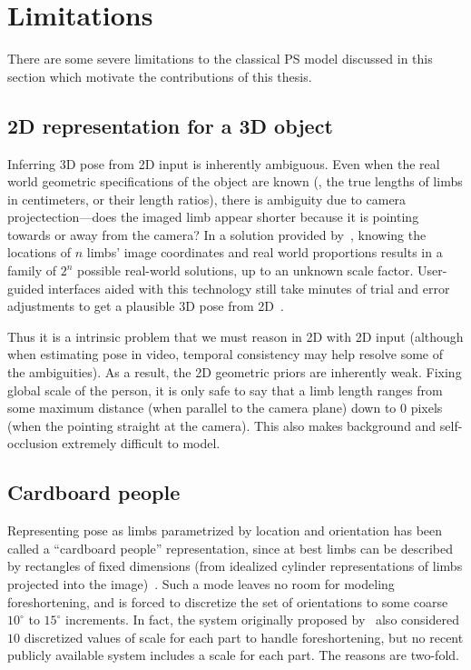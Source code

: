 \section{Limitations}

There are some severe limitations to the classical PS model discussed in this 
section which motivate the contributions of this thesis. 

\subsection{2D representation for a 3D object} Inferring 3D pose from 2D input 
is inherently ambiguous.  Even when the real world geometric specifications of 
the object are known (\eg, the true lengths of limbs in centimeters, or their 
length ratios), there is ambiguity due to camera projectection---does the 
imaged limb appear shorter because it is pointing towards or away from the 
camera?  In a solution provided by~\citet{cj-skel}, knowing the locations of 
$n$ limbs' image coordinates and real world proportions results in a family of 
$2^n$ possible real-world solutions, up to an unknown scale factor.  
User-guided interfaces aided with this technology still take minutes of trial 
and error adjustments to get a plausible 3D pose from 2D~\citep{poselets}. 

Thus it is a intrinsic problem that we must reason in 2D with 2D input 
(although when estimating pose in video, temporal consistency may help resolve 
some of the ambiguities).  As a result, the 2D geometric priors are inherently 
weak.  Fixing global scale of the person, it is only safe to say that a limb 
length ranges from some maximum distance (when parallel to the camera plane) 
down to 0 pixels (when the pointing straight at the camera).  This also makes 
background and self-occlusion extremely difficult to model.

\subsection{Cardboard people}
Representing pose  as limbs parametrized by location and orientation has been 
called a ``cardboard people'' representation, since at best limbs can be 
described by rectangles of fixed dimensions (from idealized cylinder 
representations of limbs projected into the image)~\citep{cardboard}.  Such a 
mode  leaves no room for modeling foreshortening, and is forced to discretize 
the set of orientations to some coarse $10^\circ$ to $15^\circ$ increments.  In 
fact, the system originally proposed by~\citet{felz05} also considered $10$ 
discretized values of scale for each part to handle foreshortening, but no 
recent publicly available system 
\citep{andriluka09,eichner09,sapp2010,sapp2010cascades,sapp2011} includes a 
scale for each part. The reasons are two-fold. 

